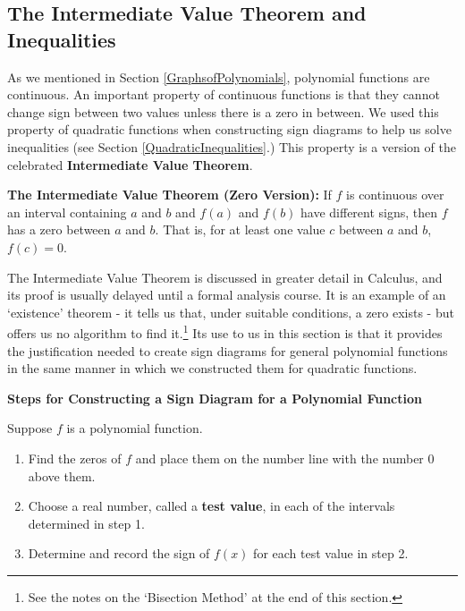 \documentclass{ximera}
\begin{document}
\subsection{The Intermediate Value Theorem and Inequalities}
\label{IVTaninequalities}

As we mentioned in Section \ref{GraphsofPolynomials}, polynomial functions are continuous.  An important property of continuous functions is that they cannot change sign between  two values unless there is a zero in between.  We used this property of quadratic functions when constructing sign diagrams to help us solve inequalities (see Section \ref{QuadraticInequalities}.)   This property is a version of the celebrated  \textbf{Intermediate Value Theorem}. 



\begin{theorem} \textbf{The Intermediate Value Theorem (Zero Version):} If $f$ is continuous over an interval containing $a$ and $b$ and $f(a)$ and $f(b)$ have different signs, then $f$ has a zero between $a$ and $b$.  That is, for at least one value $c$ between $a$ and $b$, $f(c) = 0$. 

\label{IVT}
\end{theorem}


The Intermediate Value Theorem is discussed in greater detail in Calculus, and its proof is usually delayed until a formal analysis course.  It is an example of an `existence' theorem - it tells us that, under suitable conditions, a zero exists - but offers us no algorithm to find it.\footnote{See the notes on the `Bisection Method' at the end of this section.} Its use to us in this section is that it provides the justification needed to create sign diagrams for general polynomial functions in the same manner in which we constructed them for quadratic functions.


\centerline{\textbf{Steps for Constructing a Sign Diagram for a Polynomial Function}}


Suppose $f$ is a polynomial function. 

\begin{enumerate}

\item  Find the zeros of $f$ and place them on the number line with the number $0$ above them.

\item  Choose a real number, called a \textbf{test value}, in each of the intervals determined in step 1. 

\item  Determine and record the sign of $f(x)$ for each test value in step 2.

\end{enumerate}
\end{document}
